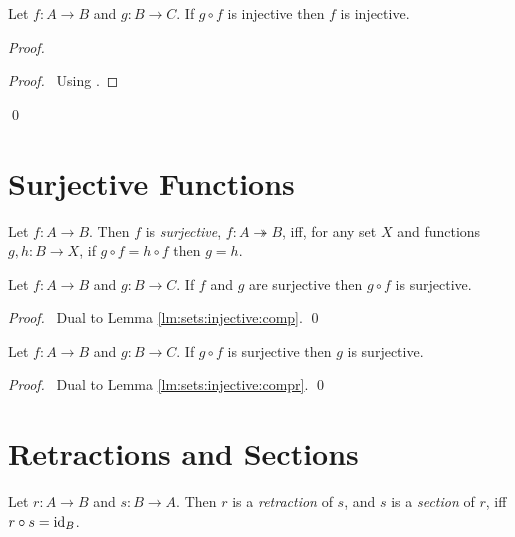 \begin{lm}
  \label{lm:sets:injective:compr}
 Let $f : A \rightarrow B$ and $g : B \rightarrow C$. If $g \circ f$ is
injective then $f$ is injective.
\end{lm}

\begin{proof}
 \pf
 \begin{proof}
   \pf\ Using .
 \end{proof}
 \qed
\end{proof}

\section{Surjective Functions}

\begin{df}[Surjective]
  Let $f : A \rightarrow B$. Then $f$ is \emph{surjective}, $f : A
\twoheadrightarrow B$, iff, for any set
  $X$ and functions $g, h : B \rightarrow X$, if $g \circ f = h \circ f$ then
  $g
  = h$.
\end{df}

\begin{lm}
 Let $f : A \rightarrow B$ and $g : B \rightarrow C$. If $f$ and $g$ are
surjective then $g \circ f$ is surjective.
\end{lm}

\begin{proof}
 \pf\ Dual to Lemma \ref{lm:sets:injective:comp}. \qed
\end{proof}

\begin{lm}
 Let $f : A \rightarrow B$ and $g : B \rightarrow C$. If $g \circ f$ is
surjective then $g$ is surjective.
\end{lm}

\begin{proof}
 \pf\ Dual to Lemma \ref{lm:sets:injective:compr}. \qed
\end{proof}

\section{Retractions and Sections}

\begin{df}
  Let $r : A \rightarrow B$ and $s : B \rightarrow A$. Then $r$ is a
  \emph{retraction} of $s$, and $s$ is a \emph{section} of $r$, iff $r \circ
  s = \mathrm{id}_{B}$.
\end{df}

